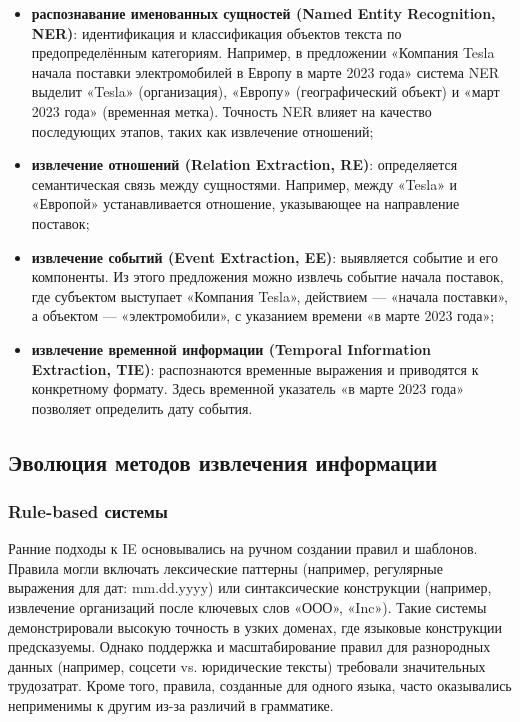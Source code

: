 \begin{itemize}
    \item \textbf{распознавание именованных сущностей (Named Entity Recognition, NER)}: идентификация и классификация объектов текста по предопределённым категориям. Например, в предложении «Компания Tesla начала поставки электромобилей в Европу в марте 2023 года» система NER выделит «Tesla» (организация), «Европу» (географический объект) и «март 2023 года» (временная метка). Точность NER влияет на качество последующих этапов, таких как извлечение отношений;

    \item \textbf{извлечение отношений (Relation Extraction, RE)}: определяется семантическая связь между сущностями. Например, между «Tesla» и «Европой» устанавливается отношение, указывающее на направление поставок;

    \item \textbf{извлечение событий (Event Extraction, EE)}: выявляется событие и его компоненты. Из этого предложения можно извлечь событие начала поставок, где субъектом выступает «Компания Tesla», действием — «начала поставки», а объектом — «электромобили», с указанием времени «в марте 2023 года»;
    
    \item \textbf{извлечение временной информации (Temporal Information Extraction, TIE)}: распознаются временные выражения и приводятся к конкретному формату. Здесь временной указатель «в марте 2023 года» позволяет определить дату события.
\end{itemize}

\subsection{Эволюция методов извлечения информации}

\subsubsection{Rule-based системы}

Ранние подходы к IE основывались на ручном создании правил и шаблонов. Правила могли включать лексические паттерны 
(например, регулярные выражения для дат: mm.dd.yyyy) или синтаксические конструкции (например, извлечение организаций после ключевых слов «ООО», «Inc»). 
Такие системы демонстрировали высокую точность в узких доменах, где языковые конструкции предсказуемы. Однако поддержка и масштабирование правил для разнородных данных (например, соцсети vs. юридические тексты) требовали значительных трудозатрат. Кроме того, правила, созданные для одного языка, часто оказывались неприменимы к другим из-за различий в грамматике.

